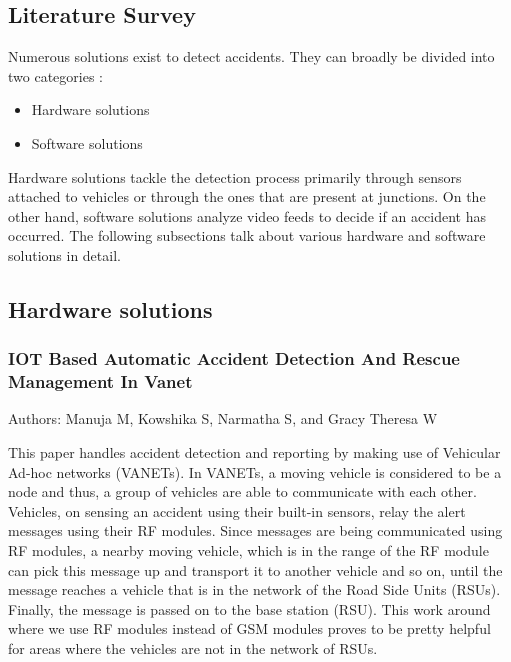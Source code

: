 \documentclass[ 12pt,a4paper,twocolumn,fleqn]{article}
\begin{document}
\begin{adjustwidth}{3.5em}{0pt}
\newpage
  \pagestyle{fancy}

\section{Literature Survey}

Numerous solutions exist to detect accidents. They can broadly be divided into two categories :
\begin{itemize}
    \item Hardware solutions
    \item Software solutions
\end{itemize}
Hardware solutions tackle the detection process primarily through sensors attached to vehicles or through the ones that are present at junctions. On the other hand, software solutions analyze video feeds to decide if an accident has occurred. The following subsections talk about various hardware  and software solutions in detail.

\hspace{0.2cm}


\subsection{Hardware solutions}

\hspace{0.2cm}


\subsubsection{IOT Based Automatic Accident Detection And Rescue Management In Vanet}

Authors: Manuja M, Kowshika S, Narmatha S, and Gracy Theresa W

This paper handles accident detection and reporting by making use of Vehicular Ad-hoc networks (VANETs). In VANETs, a moving vehicle is considered to be a node and thus, a group of vehicles are able to communicate with each other. Vehicles, on sensing an accident using their built-in sensors, relay the alert messages using their RF modules. Since messages are being communicated using RF modules, a nearby moving vehicle, which is in the range of the RF module can pick this message up and transport it to another vehicle and so on, until the message reaches a vehicle that is in the network of the Road Side Units (RSUs). Finally, the message is passed on to the base station (RSU). This work around where we use RF modules instead of GSM modules proves to be pretty helpful for areas where the vehicles are not in the network of RSUs.  




\end{adjustwidth}
\end{document}
